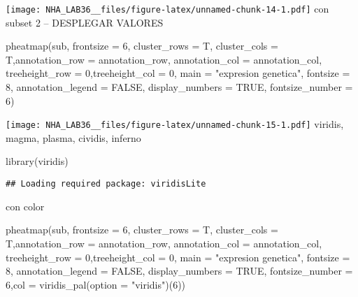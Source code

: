 \documentclass[
]{article}
\newenvironment{Shaded}{\begin{snugshade}}{\end{snugshade}}
\newcommand{\AttributeTok}[1]{\textcolor[rgb]{0.77,0.63,0.00}{#1}}
\newcommand{\ConstantTok}[1]{\textcolor[rgb]{0.00,0.00,0.00}{#1}}
\newcommand{\DecValTok}[1]{\textcolor[rgb]{0.00,0.00,0.81}{#1}}
\newcommand{\FunctionTok}[1]{\textcolor[rgb]{0.00,0.00,0.00}{#1}}
\newcommand{\NormalTok}[1]{#1}
\newcommand{\StringTok}[1]{\textcolor[rgb]{0.31,0.60,0.02}{#1}}
\begin{document}
\texttt{[image: NHA\_LAB36\_\_files/figure-latex/unnamed-chunk-14-1.pdf]}
con subset 2 -- DESPLEGAR VALORES

\begin{Shaded}
\begin{Highlighting}[]
\FunctionTok{pheatmap}\NormalTok{(sub, }\AttributeTok{frontsize =} \DecValTok{6}\NormalTok{, }\AttributeTok{cluster\_rows =}\NormalTok{ T, }\AttributeTok{cluster\_cols =}\NormalTok{ T,}\AttributeTok{annotation\_row =}\NormalTok{ annotation\_row, }\AttributeTok{annotation\_col =}\NormalTok{ annotation\_col, }\AttributeTok{treeheight\_row =} \DecValTok{0}\NormalTok{,}\AttributeTok{treeheight\_col =} \DecValTok{0}\NormalTok{, }\AttributeTok{main =} \StringTok{"expresion genetica"}\NormalTok{, }\AttributeTok{fontsize =} \DecValTok{8}\NormalTok{, }\AttributeTok{annotation\_legend =} \ConstantTok{FALSE}\NormalTok{, }\AttributeTok{display\_numbers =} \ConstantTok{TRUE}\NormalTok{, }\AttributeTok{fontsize\_number =} \DecValTok{6}\NormalTok{)}
\end{Highlighting}
\end{Shaded}

\texttt{[image: NHA\_LAB36\_\_files/figure-latex/unnamed-chunk-15-1.pdf]}
viridis, magma, plasma, cividis, inferno

\begin{Shaded}
\begin{Highlighting}[]
\FunctionTok{library}\NormalTok{(viridis)}
\end{Highlighting}
\end{Shaded}

\begin{verbatim}
## Loading required package: viridisLite
\end{verbatim}

con color

\begin{Shaded}
\begin{Highlighting}[]
\FunctionTok{pheatmap}\NormalTok{(sub, }\AttributeTok{frontsize =} \DecValTok{6}\NormalTok{, }\AttributeTok{cluster\_rows =}\NormalTok{ T, }\AttributeTok{cluster\_cols =}\NormalTok{ T,}\AttributeTok{annotation\_row =}\NormalTok{ annotation\_row, }\AttributeTok{annotation\_col =}\NormalTok{ annotation\_col, }\AttributeTok{treeheight\_row =} \DecValTok{0}\NormalTok{,}\AttributeTok{treeheight\_col =} \DecValTok{0}\NormalTok{, }\AttributeTok{main =} \StringTok{"expresion genetica"}\NormalTok{, }\AttributeTok{fontsize =} \DecValTok{8}\NormalTok{, }\AttributeTok{annotation\_legend =} \ConstantTok{FALSE}\NormalTok{, }\AttributeTok{display\_numbers =} \ConstantTok{TRUE}\NormalTok{, }\AttributeTok{fontsize\_number =} \DecValTok{6}\NormalTok{,}\AttributeTok{col =} \FunctionTok{viridis\_pal}\NormalTok{(}\AttributeTok{option =} \StringTok{"viridis"}\NormalTok{)(}\DecValTok{6}\NormalTok{))}
\end{Highlighting}
\end{Shaded}
\end{document}
